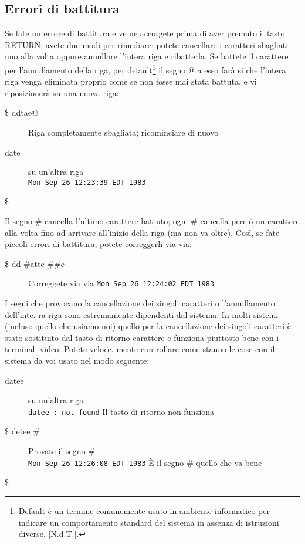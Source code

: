 \subsection{Errori di battitura}
Se fate un errore di battitura e ve ne accorgete prima di aver premuto il tasto RETURN,
avete due modi per rimediare: potete cancellare i caratteri sbagliati uno alla
volta oppure annullare l'intera riga e ribatterla.
Se battete il carattere per l'annullamento della riga, per default\footnote{Default è un termine comunemente
	usato in ambiente informatico per indicare un comportamento standard 
	del sistema in assenza di istruzioni diverse. [N.d.T.].} il segno @ a esso
farà si che l'intera riga venga eliminata proprio come se non fosse mai stata battuta, e
vi riposizionerà su una nuova riga:
\begin{description}
	\item[\$ ddtae@ ] Riga completamente sbagliata; ricominciare di nuovo
	\item[ date ]  su un'altra riga\\
	{\tt Mon Sep 26 12:23:39 EDT 1983}
	\item[\$ ]
\end{description}
Il segno \# cancella l'ultimo carattere battuto; ogni \# cancella perciò un carattere alla
volta fino ad arrivare all'inizio della riga (ma non va oltre). Così, se fate piccoli errori
di battitura, potete correggerli via via:
\begin{description}
	\item[\$ dd \#atte \#\#e] Correggete via via 
	{\tt Mon Sep 26 12:24:02 EDT 1983}
\end{description}
I segni che provocano la cancellazione dei singoli caratteri o l'annullamento dell'inte.
ra riga sono estremamente dipendenti dal sistema. In molti sistemi (incluso quello che
usiamo noi) quello per la cancellazione dei singoli caratteri è stato sostituito dal tasto
di ritorno carattere e funziona piuttosto bene con i terminali video. Potete veloce.
mente controllare come stanno le cose con il sistema da voi usato nel modo seguente:
\begin{description}
	\item[ datee \textleftarrow ]  su un'altra riga\textleftarrow\\
	{\tt datee \textleftarrow: not found} Il tasto di ritorno non funziona\\ 
	\item[\$ detee \# ] Provate il segno \#\\
	{\tt Mon Sep 26 12:26:08 EDT 1983} È il segno \# quello che va bene
	\item[\$ ]
\end{description}
